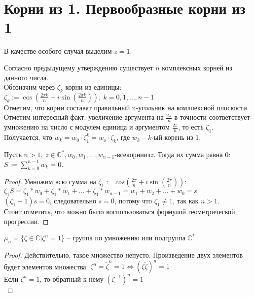 \section{Корни из 1. Первообразные корни из 1}
\begin{normalsize}
  \begin{theorem-non}
    В качестве особого случая выделим $z=1$.
  \end{theorem-non}
  Согласно предыдущему утверждению существует $n$ комплексных корней из данного числа. \\

  Обозначим через $\zeta_k$ корни из единицы: \\ 

  $\zeta_k := \cos(\frac{2\pi k}{n} + i\sin(\frac{2\pi k}{n})),\ k=0, 1, \dots, n-1$ \\

  Отметим, что корни составят правильный n-угольник на комлпексной плоскости. \\

  Отметим интересный факт: увеличение аргумента на $\frac{2\pi}{n}$ в точности соответствует умножению на число с модулем единица и аргументом $\frac{2\pi}{n}$, то есть $\zeta_1$. \\

  Получается, что $w_k = w_0\cdot\zeta_1^k = w_o\cdot\zeta_k$, где $w_k$ – $k$-ый корень из $1$.

  \begin{theorem-non}
    Пусть $n>1,\ z\in\mathbb{C}^*, w_0, w_1, \dots, w_{n-1}$-$все корни из z$. Тогда их сумма равна 0: $S:= \sum_{k=0}^{n-1}w_k = 0$. 
  \end{theorem-non}

  \begin{proof}
    Умножим всю сумма на $\zeta_1:=cos(\frac{2\pi}{n} + i\sin(\frac{2\pi}{n}))$: \\ 
    $\zeta_1S=\zeta_1*w_0 + \zeta_1*w_1 + \dots + \zeta_1*w_{n-1} = w_1 + w_2 + \dots + w_0=s$ \\
    $(\zeta_1-1)s = 0$, следовательно $s=0$, потому что $\zeta_1 \neq 1$, так как $n>1$. \\
    Стоит отметить, что можно было воспользоваться формулой геометрической прогрессии.
  \end{proof} 

  \begin{theorem-non}
    $\mu_n = \{ \zeta\in\mathbb{C} | \zeta^n = 1 \}$ – группа по умножению или подгруппа $\mathbb{C}^*$.
  \end{theorem-non}
  \begin{proof}
    Действительно, такое множество непусто. Произведение двух элементов будет элементов множества: 
    $\zeta^n = \tilde{\zeta}^n = 1 \Leftrightarrow (\zeta\tilde{\zeta})^n = 1$ \\
    Если $\zeta^n=1$, то обратный к нему $(\zeta^{-1})^n=1$ \\


\end{proof}
\end{normalsize}
